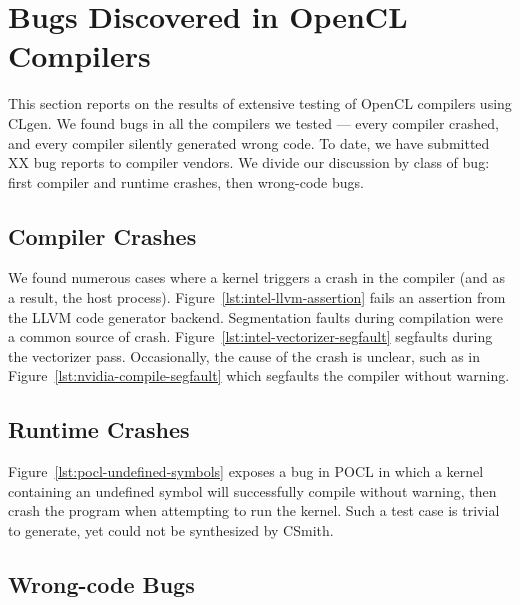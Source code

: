 \section{Bugs Discovered in OpenCL Compilers}

This section reports on the results of extensive testing of OpenCL compilers using CLgen. We found bugs in all the compilers we tested --- every compiler crashed, and every compiler silently generated wrong code. To date, we have submitted XX bug reports to compiler vendors. We divide our discussion by class of bug: first compiler and runtime crashes, then wrong-code bugs.

\subsection{Compiler Crashes}

We found numerous cases where a kernel triggers a crash in the compiler (and as a result, the host process). Figure~\ref{lst:intel-llvm-assertion} fails an assertion from the LLVM code generator backend. Segmentation faults during compilation were a common source of crash. Figure~\ref{lst:intel-vectorizer-segfault} segfaults during the vectorizer pass. Occasionally, the cause of the crash is unclear, such as in Figure~\ref{lst:nvidia-compile-segfault} which segfaults the compiler without warning.


\subsection{Runtime Crashes}

Figure~\ref{lst:pocl-undefined-symbols} exposes a bug in POCL in which a kernel containing an undefined symbol will successfully compile without warning, then crash the program when attempting to run the kernel. Such a test case is trivial to generate, yet could not be synthesized by CSmith.

\subsection{Wrong-code Bugs}


